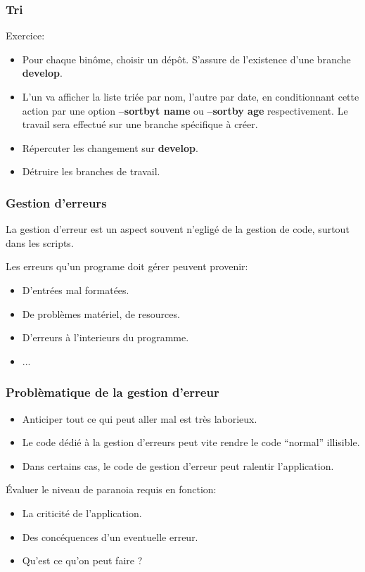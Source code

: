 \documentclass{beamer}
\begin{document}
\begin{frame}\frametitle{Tri}
  Exercice:
  \begin{itemize}
  \item Pour chaque binôme, choisir un dépôt. S'assure de l'existence d'une branche {\bf develop}.
  \item L'un va afficher la liste triée par nom, l'autre par date, en conditionnant cette action par une option {\bf --sortbyt name} ou {\bf --sortby age} respectivement. Le travail sera effectué sur une branche spécifique à créer.
  \item Répercuter les changement sur {\bf develop}.
  \item Détruire les branches de travail.
  \end{itemize}
\end{frame}

\begin{frame}\frametitle{Gestion d'erreurs}
  La gestion d'erreur est un aspect souvent n'egligé de la gestion de code, surtout dans les scripts.
  
  Les erreurs qu'un programe doit gérer peuvent provenir:
  \begin{itemize}
  \item D'entrées mal formatées.
  \item De problèmes matériel, de resources.
  \item D'erreurs à l'interieurs du programme.
  \item ...
  \end{itemize}
\end{frame}

\begin{frame}\frametitle{Problèmatique de la gestion d'erreur}
  \begin{itemize}
  \item Anticiper tout ce qui peut aller mal est très laborieux.
  \item Le code dédié à la gestion d'erreurs peut vite rendre le code ``normal'' illisible.
  \item Dans certains cas, le code de gestion d'erreur peut ralentir l'application.
  \end{itemize}
  Évaluer le niveau de paranoia requis en fonction:
  \begin{itemize}
  \item La criticité de l'application.
  \item Des concéquences d'un eventuelle erreur.
  \item Qu'est ce qu'on peut faire ?
  \end{itemize}
\end{frame}
\end{document}
